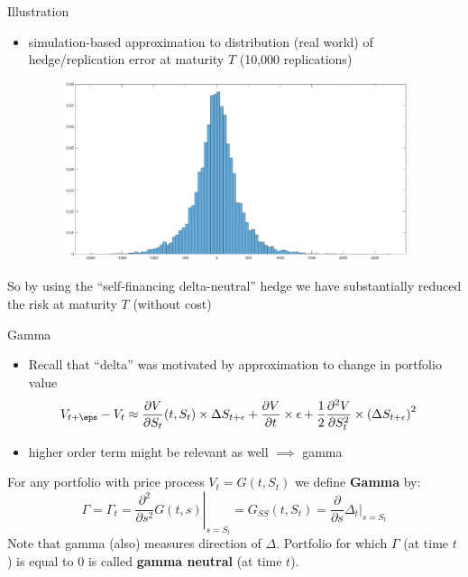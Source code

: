 \documentclass[pdf, handout]{beamer}
\begin{document}
\begin{frame}{Illustration}
\begin{itemize}
\item simulation-based approximation to distribution (real world)
of hedge/replication error at maturity $T$ (10,000 replications)
\begin{figure}
\includegraphics[width=0.95\textwidth]{distr_hedge_error.eps}
\end{figure}
\end{itemize}
So by using the ``self-financing delta-neutral'' hedge we have substantially reduced the risk at maturity $T$ (without cost)
\end{frame}

\begin{frame}{Gamma}
\begin{itemize}
\item Recall that ``delta'' was motivated by
approximation to change in portfolio value
\begin{align*}
V_{t+\eps}-V_t
&\approx
 \frac{\partial V}{\partial S_t}(t,S_t)\times \Delta S_{t+\epsilon} 
+\frac{\partial V}{\partial t}\times \epsilon 
+\frac{1}{2} \frac{\partial^2 V}{\partial S_t^2} \times 
\left(\Delta S_{t+\epsilon}\right)^2
\end{align*}
\item higher order term might
be relevant as well $\implies$ gamma 
\end{itemize}
For any portfolio with price process $V_t=G(t,S_t)$ we define
\textbf{Gamma} by:  
\[
\Gamma=\Gamma_t =\left. \frac{\partial^2 }{\partial s^2} G(t,s)\right|_{s=S_t} = G_{SS}(t, S_t) =\frac{\partial}{\partial s} \left. \Delta_t
\right|_{s=S_t}
\]
Note that gamma (also) measures direction of $\Delta$. 
Portfolio for which $\Gamma$ (at time $t$) is equal to 0 is called \textbf{gamma neutral}  (at time $t$).
\end{frame}
\end{document}
